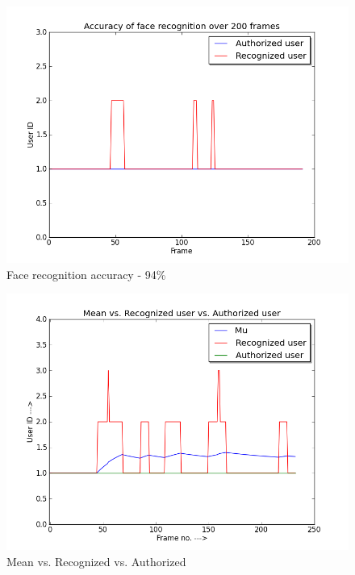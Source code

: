 \documentclass[12pt]{article}			%
\begin{document}
\begin{figure}
	\caption{Face recognition accuracy - 94\%}
	\centering
\includegraphics[scale=0.6]{img/face_rec_accuracy.png}
\end{figure}
\begin{figure}
	\caption{Mean vs. Recognized vs. Authorized}
	\centering
\includegraphics[scale=0.6]{img/mu_nearest_uid.png}
\end{figure}
\end{document}
